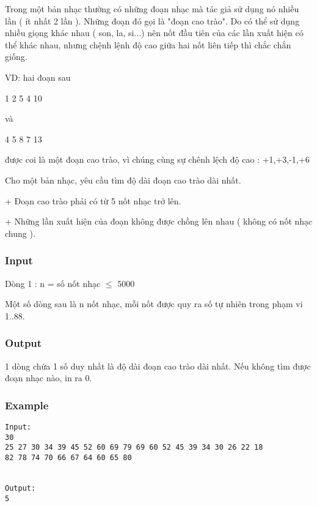 



   Trong một bản nhạc thường có những đoạn nhạc mà tác giả sử dụng nó nhiều lần ( ít nhất 2 lần ). Những đoạn đó gọi là "đoạn cao trào". Do có thể sử dụng nhiều giọng khác nhau ( son, la, si...) nên nốt đầu tiên của các lần xuất hiện có thể khác nhau, nhưng chệnh lệnh độ cao giữa hai nốt liên tiếp thì chắc chắn giống.   


   VD: hai đoạn sau   


   1 2 5 4 10   


   và   


   4 5 8 7 13   


   được coi là một đoạn cao trào, vì chúng cùng sự chênh lệch độ cao : +1,+3,-1,+6   


   Cho một bản nhạc, yêu cầu tìm độ dài đoạn cao trào dài nhất.   


   + Đoạn cao trào phải có từ 5 nốt nhạc trở lên.   


   + Những lần xuất hiện của đoạn không được chồng lên nhau ( không có nốt nhạc chung ).   




\subsubsection{   Input  }

   Dòng 1 : n = số nốt nhạc  $\le$  5000   


   Một số dòng sau là n nốt nhạc, mỗi nốt được quy ra số tự nhiên trong phạm vi 1..88.   




\subsubsection{   Output  }

   1 dòng chứa 1 số duy nhất là độ dài đoạn cao trào dài nhất. Nếu không tìm được đoạn nhạc nào, in ra 0.  

\subsubsection{   Example  }
\begin{verbatim}
Input:
30
25 27 30 34 39 45 52 60 69 79 69 60 52 45 39 34 30 26 22 18
82 78 74 70 66 67 64 60 65 80


Output:
5
\end{verbatim}
